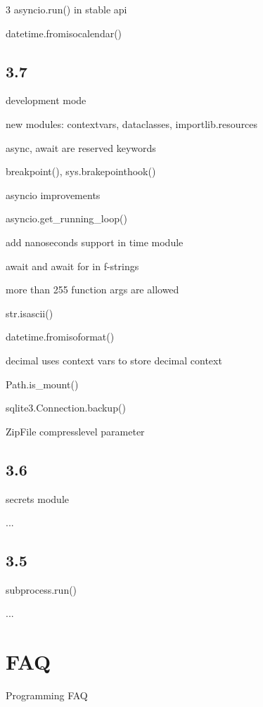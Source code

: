 \documentclass [8pt] {extarticle}
\begin{document}
\begin {multicols} {3}
    asyncio.run() in stable api

    datetime.fromisocalendar()

    \subsection {3.7}

    development mode

    new modules: contextvars, dataclasses, importlib.resources

    async, await are reserved keywords

    breakpoint(), sys.brakepointhook()

    asyncio improvements

    asyncio.get\_running\_loop()

    add nanoseconds support in time module

    await and await for in f-strings

    more than 255 function args are allowed

    str.isascii()

    datetime.fromisoformat()

    decimal uses context vars to store decimal context

    Path.is\_mount()

    sqlite3.Connection.backup()

    ZipFile compresslevel parameter

    \subsection {3.6}

    secrets module

    ...

    \subsection {3.5}

    subprocess.run()

    ...

    \end {multicols}

    \pagebreak

    \section {FAQ}

    Programming FAQ
    
\end{document}
